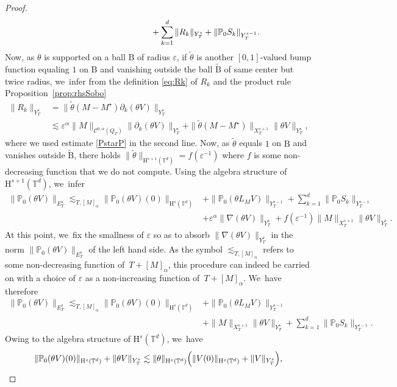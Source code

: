 \documentclass[10pt]{amsart}
\theoremstyle{definition}
\newcommand\T{\mathbb{T}}
\newcommand\B{\mathrm{B}}
\renewcommand\H{\mathrm{H}}
\let\ep\varepsilon
\begin{document}
\begin{proof}
\begin{align*}
&\hspace*{4.2cm}+ \sum_{k=1}^d \|R_k\|_{Y_T^s} +\|\mathbb{P}_0S_k\|_{Y_T^{s-1}}.
\end{align*}
Now, as $\theta$ is supported on a ball $\B$ of radius $\ep$, if $\widetilde{\theta}$ is another $[0,1]$-valued bump function equaling $1$ on $\B$ and vanishing outside the ball $\widetilde{\B}$ of same center but twice radius, we~infer from the definition \eqref{eq:Rk} of $R_k$ and the product rule Proposition~\ref{prop:rhsSobo}
\begin{align*}
\|R_k\|_{Y_T^s} &= \|\widetilde{\theta}(M-M^\star)\partial_k(\theta V)\|_{Y_T^s} \\
&\lesssim \ep^{\alpha} \|M\|_{\mathscr{C}^{0,\alpha}(Q_T)}\|\partial_k(\theta V)\|_{Y_T^s} + \|\widetilde{\theta}(M-M^\star)\|_{X_T^{s+1}}\|\theta V\|_{Y_T^s},
\end{align*}
where we used estimate \eqref{PstarP} in the second line. Now, as $\widetilde{\theta}$ equals $1$ on $\B$ and vanishes outside $\widetilde{\B}$, there holds $\|\widetilde{\theta}\|_{\H^{s+1}(\T^d)} = f(\ep^{-1})$ where $f$ is some non-decreasing function that we do not compute. Using the algebra structure of $\H^{s+1}(\T^d)$, we~infer
\vspace{-0.3cm}
\begin{align*}
\|\mathbb{P}_0(\theta V)\|_{E_T^s} \lesssim_{T,[M]_\alpha}
\|\mathbb{P}_0(\theta V)(0)\|_{\H^s(\T^d)} &+ \| \mathbb{P}_0(\theta L_{M} V)\|_{Y_T^{s-1}} + \sum_{k=1}^d \|\mathbb{P}_0S_k\|_{Y_T^{s-1}}\\
&+ \ep^\alpha \|\nabla(\theta V)\|_{Y_T^s} + f(\ep^{-1})\|M\|_{X_T^{s+1}}\|\theta V\|_{Y_T^s}.
\end{align*}
At this point, we~fix the smallness of $\ep$ so as to absorb $\|\nabla(\theta V)\|_{Y_T^s}$ in the norm $\|\mathbb{P}_0(\theta V)\|_{E_T^s}$ of the left hand side. As the symbol $\lesssim_{T,[M]_\alpha}$ refers to some non-decreasing function of~$T+[M]_\alpha$, this procedure can indeed be carried on with a choice of $\ep$ as a non-increasing function of~$T+[M]_\alpha$. We~have therefore
\begin{align*}
\|\mathbb{P}_0(\theta V)\|_{E_T^s} \lesssim_{T,[M]_\alpha}
\|\mathbb{P}_0(\theta V)(0)\|_{\H^s(\T^d)} &+ \|\mathbb{P}_0(\theta L_{M} V)\|_{Y_T^{s-1}} \\
&+ \|M\|_{X_T^{s+1}}\|\theta V\|_{Y_T^s} +\sum_{k=1}^d \|\mathbb{P}_0S_k\|_{Y_T^{s-1}}.
\end{align*}
Owing to the algebra structure of $\H^s(\T^d)$, we~have
\[
\|\mathbb{P}_0(\theta V)(0)\|_{\H^s(\T^d)} + \|\theta V\|_{Y_T^s} \lesssim \|\theta\|_{\H^s(\T^d)} \Bigl(\|V(0)\|_{\H^s(\T^d)} + \|V\|_{Y_T^s}\Bigr),
\]
\end{proof}
\end{document}
